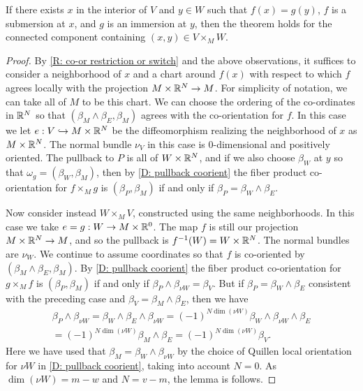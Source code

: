 \begin{lemma}\label{L: im/sub}
If there exists $x$ in the interior of $V$ and $y\in W$ such that  $f(x)=g(y)$, $f$ is a submersion at $x$, and $g$ is an immersion at $y$, then the theorem holds for the connected component containing $(x,y)\in V\times_MW$.
\end{lemma}
\begin{proof}
By \cref{R: co-or restriction or switch} and the above observations, it suffices to consider a neighborhood of $x$ and a chart around $f(x)$ with respect to which $f$ agrees locally with the projection $M\times \mathbb{R}^N\to M$. For simplicity of notation, we can take all of $M$ to be this chart. We can choose the ordering of the co-ordinates in $\mathbb{R}^N$ so that $(\beta_M\wedge \beta_E,\beta_M)$ agrees with the co-orientation for $f$. In this case we let $e:V\hookrightarrow M\times \mathbb{R}^N$ be the diffeomorphism realizing the neighborhood of $x$ as $M\times \mathbb{R}^N$. The normal bundle $\nu_V$ in this case is $0$-dimensional and positively oriented.
The pullback to $P$ is all of $W\times \mathbb{R}^N$, and if we also choose $\beta_W$ at $y$ so that $\omega_g=(\beta_W,\beta_M)$, then by \cref{D: pullback coorient} the fiber product  co-orientation for $f\times_Mg$ is $(\beta_P,\beta_M)$ if and only if $\beta_P=\beta_W\wedge \beta_E$.

Now consider instead $W\times_MV$, constructed using the same neighborhoods. In this case we take  $e=g:W\to M\times \mathbb{R}^0$. The map $f$ is still our projection $M\times \mathbb{R}^N\to M$, and so the pullback is $f^{-1}(W)=W\times \mathbb{R}^N$. The normal bundles are $\nu_W$. We continue to assume coordinates so that $f$ is co-oriented by $(\beta_M\wedge \beta_E, \beta_M)$.
By \cref{D: pullback coorient} the fiber product  co-orientation for $g\times_Mf$ is $(\beta_P,\beta_M)$ if and only if $\beta_P\wedge \beta_{\nu W} =\beta_V$. But if $\beta_P=\beta_W\wedge \beta_E$ consistent with the preceding case and $\beta_V=\beta_M\wedge \beta_E$, then we have
\begin{multline*}\beta_P\wedge \beta_{\nu W}=\beta_W\wedge \beta_E\wedge \beta_{\nu W}=(-1)^{N\dim(\nu W)}\beta_W\wedge \beta_{\nu W}\wedge \beta_E\\=(-1)^{N\dim(\nu W)}\beta_M\wedge \beta_E=(-1)^{N\dim(\nu W)}\beta_V.\end{multline*}
Here we have used that $\beta_M=\beta_W\wedge \beta_{\nu W}$ by the choice of Quillen local orientation for $\nu W$ in \cref{D: pullback coorient}, taking into account $N=0$.
As $\dim(\nu W)=m-w$ and $N=v-m$, the lemma is follows.
\end{proof}


